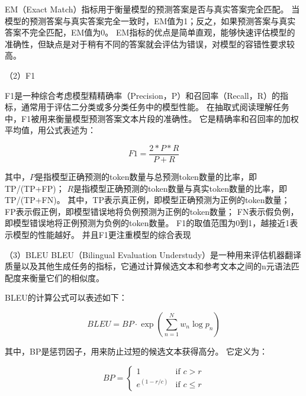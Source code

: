 EM（Exact Match）指标用于衡量模型的预测答案是否与真实答案完全匹配。
当模型的预测答案与真实答案完全一致时，EM值为1；反之，如果预测答案与真实答案不完全匹配，EM值为0。
EM指标的优点是简单直观，能够快速评估模型的准确性，但缺点是对于稍有不同的答案就会评估为错误，对模型的容错性要求较高。

（2）F1

F1是一种综合考虑模型精精确率（Precision，P）和召回率（Recall，R）的指标，通常用于评估二分类或多分类任务中的模型性能。
在抽取式阅读理解任务中，F1被用来衡量模型预测答案文本片段的准确性。
它是精确率和召回率的加权平均值，用公式表述为：

$$F1=\frac{2*P*R}{P+R}$$

其中，$P$是指模型正确预测的token数量与总预测token数量的比率，即TP/(TP+FP)；
$R$是指模型正确预测的token数量与真实token数量的比率，即TP/(TP+FN)。
其中，TP表示真正例，即模型正确预测为正例的token数量；
FP表示假正例，即模型错误地将负例预测为正例的token数量；
FN表示假负例，即模型错误地将正例预测为负例的token数量。
F1的取值范围为0到1，越接近1表示模型的性能越好。
并且F1更注重模型的综合表现


（3）BLEU
BLEU（Bilingual Evaluation Understudy）是一种用来评估机器翻译质量以及其他生成任务的指标，它通过计算候选文本和参考文本之间的n元语法匹配度来衡量它们的相似度。


BLEU的计算公式可以表述如下：

$$BLEU = BP \cdot \exp \left( \sum_{n=1}^{N} w_n \log p_n \right)$$

其中，BP是惩罚因子，用来防止过短的候选文本获得高分。
它定义为：

$$
BP = 
\begin{cases}
1 & \text{if } c > r \\
e^{(1-r/c)} & \text{if } c \leq r
\end{cases}
$$

